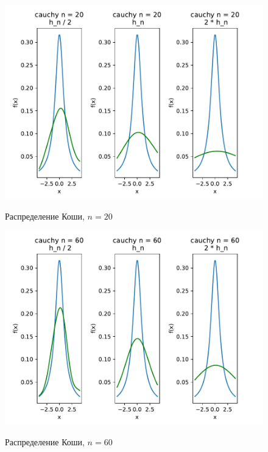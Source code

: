 \documentclass[a4paper]{article}
\begin{document}
\begin{figure}[H]
	\centering
	{\includegraphics[scale=0.5]{src_lab_4/kde_20_cauchy}}
		\caption{Распределение Коши, $n=20$}
		\label{fig:kde_cauchy_20}
	\end{figure}

\begin{figure}[H]
	\centering
	{\includegraphics[scale=0.5]{src_lab_4/kde_60_cauchy}}
		\caption{Распределение Коши, $n=60$}
		\label{fig:kde_cauchy_60}
	\end{figure}
\end{document}
